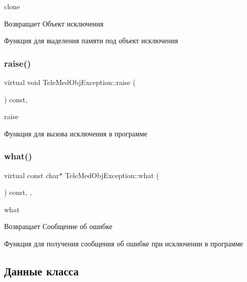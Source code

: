 clone 

\begin{DoxyReturn}{Возвращает}
Объект исключения
\end{DoxyReturn}
Функция для выделения памяти под объект исключения \mbox{\label{classTeleMedObjException_a367ddc1ca442487da31f7557bd4bc6ff}} 
\subsubsection{\texorpdfstring{raise()}{raise()}}
{\footnotesize\ttfamily virtual void Tele\+Med\+Obj\+Exception\+::raise (\begin{DoxyParamCaption}{ }\end{DoxyParamCaption}) const\hspace{0.3cm}{\ttfamily [inline]}, {\ttfamily [virtual]}}



raise 

Функция для вызова исключения в программе \mbox{\label{classTeleMedObjException_a4d0745f8597c3273301fa88000e35cd8}} 
\subsubsection{\texorpdfstring{what()}{what()}}
{\footnotesize\ttfamily virtual const char$\ast$ Tele\+Med\+Obj\+Exception\+::what (\begin{DoxyParamCaption}{ }\end{DoxyParamCaption}) const\hspace{0.3cm}{\ttfamily [inline]}, {\ttfamily [virtual]}, {\ttfamily [noexcept]}}



what 

\begin{DoxyReturn}{Возвращает}
Сообщение об ошибке
\end{DoxyReturn}
Функция для получения сообщения об ошибке при исключении в программе 

\subsection{Данные класса}
\mbox{\label{classTeleMedObjException_a91ff803c7abad201ad2bb96a2149ea5e}} 
